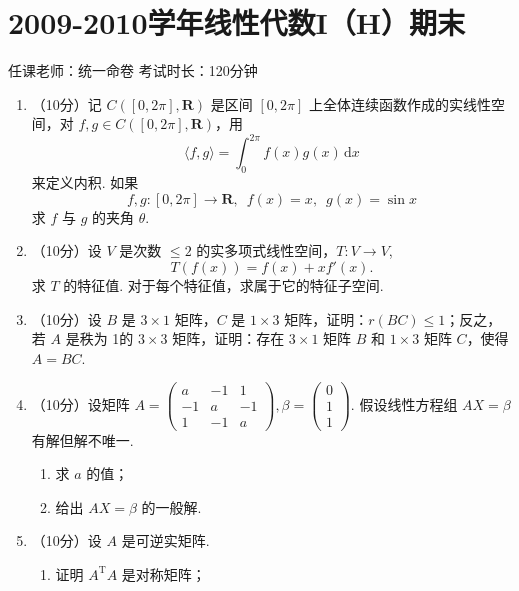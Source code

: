 \section{2009-2010学年线性代数I（H）期末}

\begin{center}
    任课老师：统一命卷\hspace{4em} 考试时长：120分钟
\end{center}

\begin{enumerate}
    \item （10分）记 $C([0,2\pi],\mathbf{R})$ 是区间 $[0,2\pi]$ 上全体连续函数作成的实线性空间，对 $f,g \in C([0,2\pi],\mathbf{R})$，用
    \[\langle f,g\rangle = \int_0^{2\pi}f(x)g(x)\,\mathrm{d}x\]
    来定义内积. 如果
    \[f,g\colon [0,2\pi] \to \mathbf{R},\enspace f(x)=x,\enspace g(x)=\sin x\]
    求 $f$ 与 $g$ 的夹角 $\theta$.

    \item （10分）设 $V$ 是次数 $\leqslant 2$ 的实多项式线性空间，$T\colon V\to V$,
    \[T(f(x)) = f(x) + xf'(x).\]
    求 $T$ 的特征值. 对于每个特征值，求属于它的特征子空间.

    \item （10分）设 $B$ 是 $3\times 1$ 矩阵，$C$ 是 $1\times 3$ 矩阵，证明：$r(BC)\leqslant 1$；反之，若 $A$ 是秩为 1的 $3\times 3$ 矩阵，证明：存在 $3\times 1$ 矩阵 $B$ 和 $1\times 3$ 矩阵 $C$，使得 $A=BC$.

    \item （10分）设矩阵 $A=\begin{pmatrix}a & -1 & 1 \\ -1 & a & -1 \\ 1 & -1 & a\end{pmatrix},\beta =\begin{pmatrix}0 \\ 1 \\ 1\end{pmatrix}$. 假设线性方程组 $AX=\beta$ 有解但解不唯一.
    \begin{enumerate}
        \item 求 $a$ 的值；

        \item 给出 $AX=\beta$ 的一般解.
    \end{enumerate}

    \item （10分）设 $A$ 是可逆实矩阵.
    \begin{enumerate}
        \item 证明 $A^{\mathrm{T}}A$ 是对称矩阵；


\end{enumerate}
\end{enumerate}
